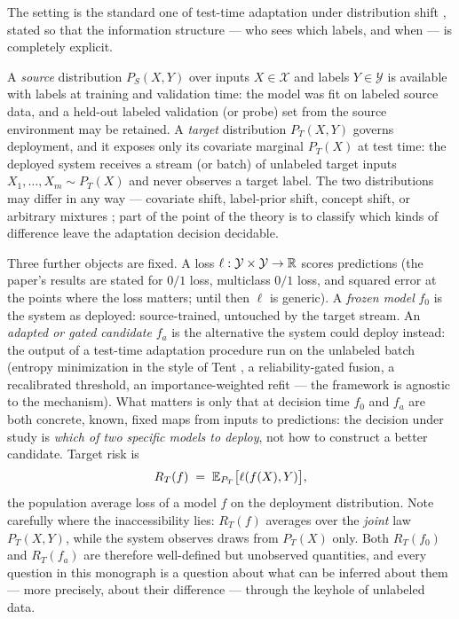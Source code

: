 The setting is the standard one of test-time adaptation under distribution
shift \cite{wang2021tent, quinonero2009dataset}, stated so that the
information structure --- who sees which labels, and when --- is completely
explicit.

A \emph{source} distribution $P_S(X,Y)$ over inputs $X \in \mathcal{X}$ and
labels $Y \in \mathcal{Y}$ is available with labels at training and validation
time: the model was fit on labeled source data, and a held-out labeled
validation (or probe) set from the source environment may be retained. A
\emph{target} distribution $P_T(X,Y)$ governs deployment, and it exposes only
its covariate marginal $P_T(X)$ at test time: the deployed system receives a
stream (or batch) of unlabeled target inputs $X_1, \dots, X_m \sim P_T(X)$ and
never observes a target label. The two distributions may differ in any way
--- covariate shift, label-prior shift, concept shift, or arbitrary mixtures
\cite{quinonero2009dataset, shimodaira2000improving, lipton2018detecting};
part of the point of the theory is to classify which kinds of difference
leave the adaptation decision decidable.

Three further objects are fixed. A loss $\ell : \mathcal{Y} \times
\mathcal{Y} \to \mathbb{R}$ scores predictions (the paper's results are stated for
$0/1$ loss, multiclass $0/1$ loss, and squared error at the points where the
loss matters; until then $\ell$ is generic). A \emph{frozen model} $f_0$ is
the system as deployed: source-trained, untouched by the target stream. An
\emph{adapted or gated candidate} $f_a$ is the alternative the system could
deploy instead: the output of a test-time adaptation procedure run on the
unlabeled batch (entropy minimization in the style of Tent
\cite{wang2021tent}, a reliability-gated fusion, a recalibrated threshold, an
importance-weighted refit --- the framework is agnostic to the mechanism).
What matters is only that at decision time $f_0$ and $f_a$ are both concrete,
known, fixed maps from inputs to predictions: the decision under study is
\emph{which of two specific models to deploy}, not how to construct a better
candidate. Target risk is
\[
R_T(f) \;=\; \mathbb{E}_{P_T}\bigl[\ell(f(X), Y)\bigr],
\]
the population average loss of a model $f$ on the deployment distribution.
Note carefully where the inaccessibility lies: $R_T(f)$ averages over the
\emph{joint} law $P_T(X,Y)$, while the system observes draws from $P_T(X)$
only. Both $R_T(f_0)$ and $R_T(f_a)$ are therefore well-defined but
unobserved quantities, and every question in this monograph is a question
about what can be inferred about them --- more precisely, about their
difference --- through the keyhole of unlabeled data.

